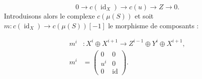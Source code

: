 \[
0\longrightarrow c(\operatorname{id}_X)\longrightarrow c(u)
\longrightarrow Z\longrightarrow0.
\]
Introduisons alors le complexe $c(\mu(S))$ et soit
$m\colon c(\operatorname{id}_X)\longrightarrow c(\mu(S))[-1]$ le
morphisme de composants :

\begin{equation}
\begin{aligned}
m^i&\colon X^i\oplus X^{i+1}
  \longrightarrow Z^{i-1}\oplus Y^i\oplus X^{i+1},\\[2pt]
m^i&=
\begin{pmatrix}
0&0\\
u^i&0\\
0&\operatorname{id}
\end{pmatrix}.
\end{aligned}
\tag{1.3.2.2}
\end{equation}
\endgroup
